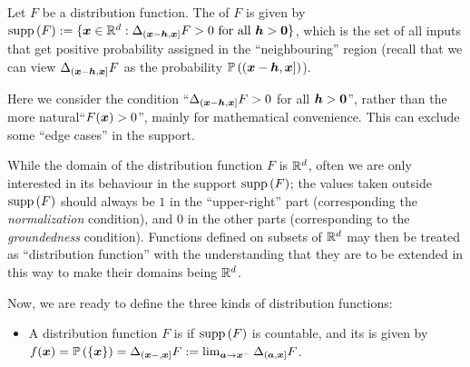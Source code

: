 \begin{enumerate}
Let \(F\) be a distribution function. The  of \(F\) is given by
\(\operatorname{supp}\left(F\right):= \{\bm{x}\in\mathbb{R}^d:\Delta_{(\bm{x}-\bm{h},\bm{x}]}F>0\text{
for all }\bm{h}>\bm{0}\}\), which is the set of all inputs that get
positive probability assigned in the ``neighbouring'' region (recall that we
can view \(\Delta_{(\bm{x}-\bm{h},\bm{x}]}F\) as the probability
\(\mathbb{P}\left((\bm{x}-\bm{h},\bm{x}]\right)\)). \begin{note}
Here we consider the condition ``\(\Delta_{(\bm{x}-\bm{h},\bm{x}]}F>0\)
for all \(\bm{h}>\bm{0}\)'', rather than the more
natural``\(F(\bm{x})>0\)'', mainly for mathematical convenience.
This can exclude some ``edge cases'' in the support.
\end{note}

While the domain of the distribution function \(F\) is \(\mathbb{R}^d\), often we are
only interested in its behaviour in the support \(\operatorname{supp}\left(F\right)\); the values taken
outside \(\operatorname{supp}\left(F\right)\) should always be \(1\) in the ``upper-right'' part
(corresponding the \emph{normalization} condition), and \(0\) in the other
parts (corresponding to the \emph{groundedness} condition). Functions defined
on subsets of \(\mathbb{R}^d\) may then be treated as ``distribution function'' with
the understanding that they are to be extended in this way to make their
domains being \(\mathbb{R}^d\).

Now, we are ready to define the three kinds of distribution functions:
\begin{itemize}
\item A distribution function \(F\) is  if \(\operatorname{supp}\left(F\right)\) is
countable, and its  is given by
\(f(\bm{x})=\mathbb{P}\left(\{\bm{x}\}\right)
=\Delta_{(\bm{x}-,\bm{x}]}F
:=\lim_{\bm{a}\to \bm{x}^{-}}\Delta_{(\bm{a},\bm{x}]}F\).


\end{itemize}
\end{enumerate}
